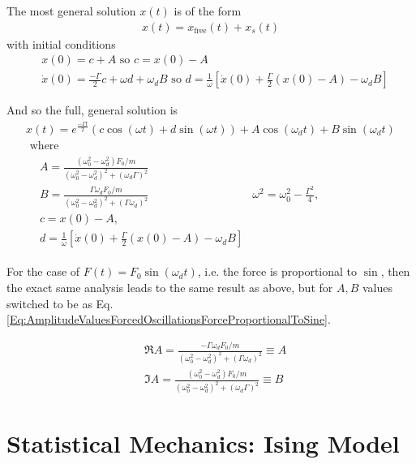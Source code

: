 \documentclass[10pt]{amsart}
\begin{document}
\begin{multicols*}{2}
The most general solution $x(t)$ is of the form
\[
\begin{gathered}
x(t) = x_{\text{free}}(t) + x_s(t)
\end{gathered}
\]
with initial conditions
\[
\begin{aligned}
& x(0) = c + A \text{ so } c = x(0) - A \\
& \dot{x}(0) = \frac{-\Gamma}{2} c + \omega d + \omega_d B \text{ so } d = \frac{1}{\omega} \left[ \dot{x}(0) + \frac{\Gamma}{2} (x(0) - A) - \omega_d B \right]
\end{aligned}
\]

And so the full, general solution is 
\begin{equation}
\begin{gathered}
x(t) = e^{\frac{-\Gamma t}{2} } (c\cos{(\omega t)} + d \sin{ (\omega t)} ) + A \cos{ (\omega_d t)} + B \sin{(\omega_d t)} \\
\text{ where } \\
\begin{aligned}
& A = \frac{ (\omega_0^2 - \omega_d^2) F_0 / m }{ (\omega_0^2 - \omega_d^2)^2 + (\omega_d \Gamma)^2 } \\
& B = \frac{ \Gamma \omega_d F_0 / m }{ (\omega_0^2 - \omega_d^2)^2 + (\Gamma \omega_d)^2 }
& \omega^2 = \omega_0^2 - \frac{\Gamma^2}{4}, \\
& c = x(0) - A, \\
& d = \frac{1}{\omega} \left[ \dot{x}(0) + \frac{\Gamma}{2} (x(0) - A) - \omega_d B \right]
\end{aligned}
\end{gathered}
\end{equation}

For the case of $F(t) = F_0 \sin{(\omega_d t)}$, i.e. the force is proportional to $\sin$, then the exact same analysis leads to the same result as above, but for $A,B$ values switched to be as Eq. \ref{Eq:AmplitudeValuesForcedOscillationsForceProportionalToSine}.

\[
\begin{aligned}
& \Re{A} = \frac{ -\Gamma \omega_d F_0 /m }{ (\omega_0^2 - \omega_d^2)^2 + (\Gamma \omega_d )^2 } \equiv A \\
& \Im{A} = \frac{ (\omega_0^2 - \omega_d^2) F_0/m }{(\omega_0^2 - \omega_d^2)^2 + (\omega_d \Gamma)^2} \equiv B 
\end{aligned}
\]

\part{Statistical Mechanics: Ising Model}  


\end{multicols*}
\end{document}
